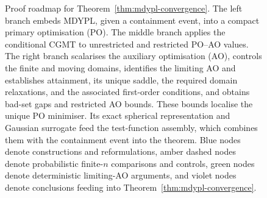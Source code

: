 \documentclass{article}
\theoremstyle{definition}
\begin{document}
\begin{bibunit}
\begin{figure}[H]
\begin{tikzpicture}
\end{tikzpicture}
\caption{Proof roadmap for Theorem~\ref{thm:mdypl-convergence}.
The left branch embeds MDYPL, given a containment event, into a compact primary
optimisation (PO).
The middle branch applies the conditional CGMT to unrestricted and
restricted PO--AO values.
The right branch scalarises the auxiliary optimisation (AO), controls the
finite and moving domains, identifies the limiting AO and establishes
attainment, its unique saddle, the required domain relaxations, and the
associated first-order conditions, and obtains
bad-set gaps and restricted AO bounds.
These bounds localise the unique PO minimiser.
Its exact spherical representation and Gaussian surrogate feed the
test-function assembly, which combines them with the containment event
into the theorem.
Blue nodes denote constructions and reformulations, amber dashed nodes
denote probabilistic finite-$n$ comparisons and controls, green nodes
denote deterministic limiting-AO arguments, and violet nodes
denote conclusions feeding into
Theorem~\ref{thm:mdypl-convergence}.}
\label{fig:roadmap}
\end{figure}


\end{bibunit}
\end{document}
